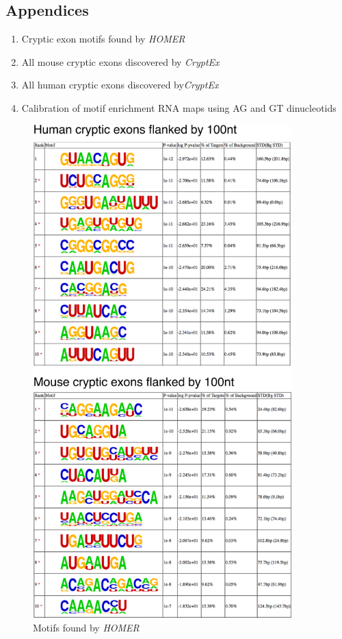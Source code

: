
\begin{appendices}
	\section*{Appendices}
	\begin{enumerate}
		\item Cryptic exon motifs found by \textit{HOMER}\\
		\item All mouse cryptic exons discovered by \textit{CryptEx}\\ 
		\item All human cryptic exons discovered by\textit{CryptEx}\\
		
		\item Calibration of motif enrichment RNA maps using AG and GT dinucleotids
	\end{enumerate}

\clearpage	


\begin{figure}
	\begin{center}
		\includegraphics[width=10cm]{Figures/03_cryptic_exons/Figure_S4_HOMER.png}
	\end{center}
	\caption{Motifs found by \textit{HOMER}}
\end{figure}


\end{appendices}
